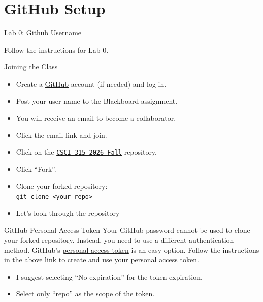 \documentclass[14pt,aspectratio=1610]{beamer}
\begin{document}
\section*{GitHub Setup}

\begin{frame}{Lab 0: Github Username}
\begin{center}\Large
  Follow the instructions for Lab 0.
\end{center}
\end{frame}

\begin{frame}{Joining the Class}
  \begin{itemize}
  \item Create a \href{https://github.com/}{GitHub} account (if needed) and log in.
  \item Post your user name to the Blackboard assignment.
  \item You will receive an email to become a collaborator.
  \item Click the email link and join.
  \item Click on the \href{https://github.com/csu-cs/CSCI-315-2026-Fall/}{\texttt{CSCI-315-2026-Fall}} repository.
  \item Click ``Fork''.
  \item Clone your forked repository:\\
  \lstinline{git clone <your repo>}
  \item Let's look through the repository\textellipsis
  \end{itemize}
\end{frame}

\begin{frame}[fragile]{GitHub Personal Access Token}
  Your GitHub password cannot be used to clone your forked repository. Instead, you need to use a different authentication method. GitHub's \href{https://docs.github.com/en/authentication/keeping-your-account-and-data-secure/managing-your-personal-access-tokens}{personal access token} is an easy option. Follow the instructions in the above link to create and use your personal access token.
  \begin{itemize}
    \item I suggest selecting ``No expiration'' for the token expiration.
    \item Select only ``repo'' as the scope of the token.
  \end{itemize}
\end{frame}
\end{document}

